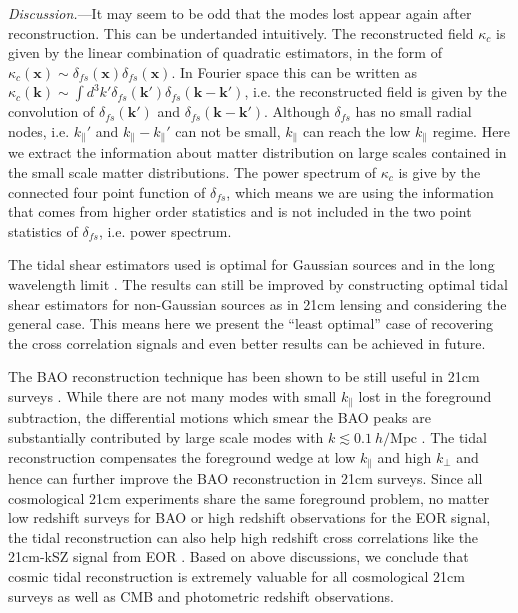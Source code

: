 \documentclass[aps,prl,twocolumn,showpacs,superscriptaddress,groupedaddress,nofootinbib]{revtex4}  %
\newcommand{\mr}{\mathrm}
\begin{document}
{\it Discussion.}---It may seem to be odd that the modes lost appear again
after reconstruction. This can be undertanded intuitively.
The reconstructed field $\kappa_c$ is given by the linear combination of 
quadratic estimators, in the form of 
$\kappa_c(\bm{x})\sim\delta_{fs}(\bm{x})\delta_{fs}(\bm{x})$. In Fourier 
space this can be written as $\kappa_c(\bm{k})\sim\int d^3k'
\delta_{fs}(\bm{k}')\delta_{fs}(\bm{k}-\bm{k}')$, i.e. the reconstructed 
field is given by the convolution of $\delta_{fs}(\bm{k}')$ and 
$\delta_{fs}(\bm{k}-\bm{k}')$. Although $\delta_{fs}$ has no small radial
nodes, i.e. $k_{\parallel}'$ and $k_\parallel-k_{\parallel}'$ can not be small,
$k_\parallel$ can reach the low $k_\parallel$ regime.
Here we extract the information about matter distribution on large scales 
contained in the small scale matter distributions. The power spectrum of 
$\kappa_c$ is give by the connected four point function of $\delta_{fs}$,
which means we are using the information that comes from higher order statistics
and is not included in the two point statistics of $\delta_{fs}$, i.e. 
power spectrum.

The tidal shear estimators used is optimal for Gaussian sources and in the 
long wavelength limit \cite{2015:zhu}.
The results can still be improved by constructing optimal tidal shear 
estimators for non-Gaussian sources as in 21cm lensing \cite{2010:lu} and 
considering the general case. This means here we present the ``least optimal''
case of recovering the cross correlation signals and even better results can be
achieved in future.

The BAO reconstruction technique \cite{2007:bao} has been shown to be still
useful in 21cm surveys \cite{2015:bao1}\cite{2015:bao2}. While there are not 
many modes with small $k_\parallel$ lost in the foreground subtraction, the 
differential motions which smear the BAO peaks are substantially contributed
by large scale modes with $k\lesssim0.1\ h/\mr{Mpc}$ \cite{2007:bao}.
The tidal reconstruction compensates the foreground wedge at low $k_\parallel$
and high $k_\perp$ and hence can further improve the BAO reconstruction in 
21cm surveys. Since all cosmological 21cm experiments share the same foreground
problem, no matter low redshift surveys for BAO or high redshift observations
for the EOR signal, the tidal reconstruction can also help high redshift cross 
correlations like the 21cm-kSZ signal from EOR \cite{2015:marcelo}. Based
on above discussions, we conclude that cosmic tidal reconstruction is extremely
valuable for all cosmological 21cm surveys as well as CMB and photometric
redshift observations.
\end{document}
